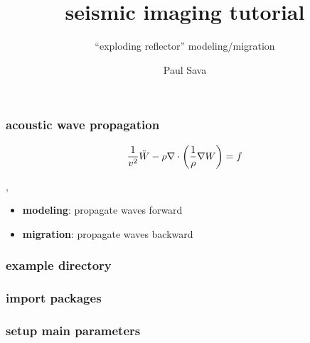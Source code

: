 


\title[]{seismic imaging tutorial}
\subtitle{``exploding reflector'' modeling/migration}
\author[]{Paul Sava}
\date{}
\logo{}
\large

 { \cwpcover }


\begin{frame} \frametitle{acoustic wave propagation}

\[
\frac{1}{v^2} \ddot{W} - 
\rho \nabla \cdot {\left (\frac{1}{\rho} \nabla {W} \right)} = f
\]

\sep

\begin{itemize}
   \item \textbf{modeling}: propagate waves forward
   \item \textbf{migration}: propagate waves backward 
\end{itemize}

\end{frame}
\cwpnote{}

\begin{frame} \frametitle{example directory}
\end{frame}
\cwpnote{}

\begin{frame} \frametitle{import packages}
  \normalsize
  \blueshade{
    
  }
\end{frame}
\cwpnote{}

\begin{frame} \frametitle{setup main parameters}
  \normalsize
  \blueshade{
    
  }
\end{frame}
\cwpnote{}

